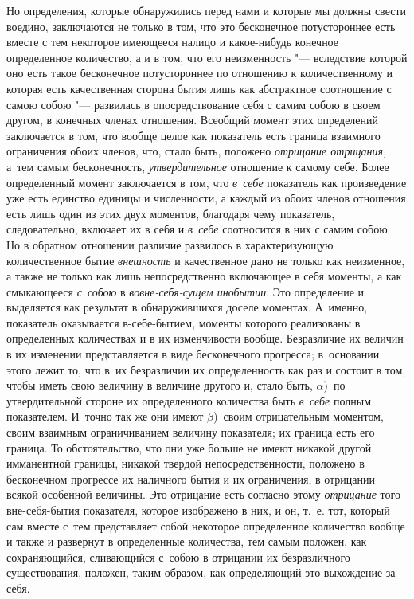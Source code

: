 Но определения, которые обнаружились перед нами и которые мы должны свести
воедино, заключаются не только в том, что это бесконечное потустороннее есть
вместе с тем некоторое имеющееся налицо и какое-нибудь конечное определенное
количество, а и в том, что его неизменность "--- вследствие которой оно есть
такое бесконечное потустороннее по отношению к количественному и которая есть
качественная сторона бытия лишь как абстрактное соотношение с самою собою "---
развилась в опосредствование себя с самим собою в своем другом, в конечных
членах отношения. Всеобщий момент этих определений заключается в том, что
вообще целое как показатель есть граница взаимного ограничения обоих членов,
что, стало быть, положено {\em отрицание отрицания,} а~тем самым бесконечность,
{\em утвердительное} отношение к самому себе. Более определенный момент
заключается в том, что {\em в~себе} показатель как произведение уже есть
единство единицы и численности, а каждый из обоих членов отношения есть лишь
один из этих двух моментов, благодаря чему показатель, следовательно, включает
их в себя и {\em в~себе} соотносится в них с самим собою. Но в обратном
отношении различие развилось в характеризующую количественное бытие
{\em внешность} и качественное дано не только как неизменное, а также не только
как лишь непосредственно включающее в себя моменты, а как смыкающееся
{\em с~собою} в {\em вовне-себя-сущем инобытии}. Это определение и выделяется
как результат в обнаружившихся доселе моментах. А~именно, показатель
оказывается в-себе-бытием, моменты которого реализованы в определенных
количествах и в их изменчивости вообще. Безразличие их величин в их изменении
представляется в виде бесконечного прогресса; в~основании этого лежит то, что
в~их безразличии их определенность как раз и состоит в том, чтобы иметь свою
величину в величине другого и, стало быть, $\alpha$)~по утвердительной стороне
их определенного количества быть {\em в~себе} полным показателем. И~точно так
же они имеют $\beta$)~своим отрицательным моментом, своим взаимным
ограничиванием величину показателя; их граница есть его граница. То
обстоятельство, что они уже больше не имеют никакой другой имманентной границы,
никакой твердой непосредственности, положено в бесконечном
прогрессе их наличного бытия и их ограничения, в отрицании всякой особенной
величины. Это отрицание есть согласно этому {\em отрицание} того вне-себя-бытия
показателя, которое изображено в них, и он, т.~е. тот, который сам вместе с~тем
представляет собой некоторое определенное количество вообще и также и развернут
в определенные количества, тем самым положен, как сохраняющийся, сливающийся
с~собою в отрицании их безразличного существования, положен, таким образом, как
определяющий это выхождение за себя.

